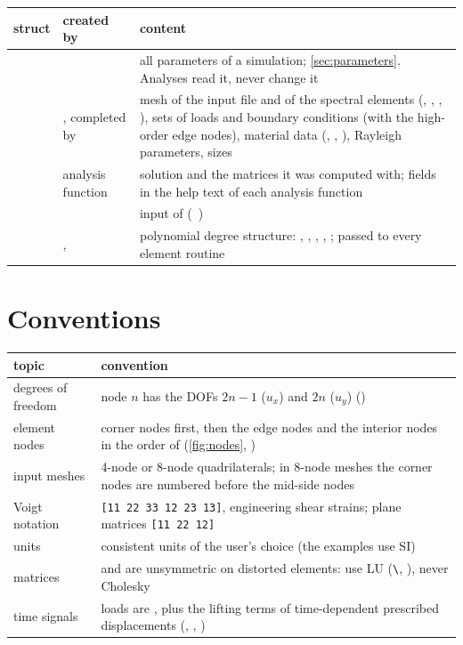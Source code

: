 \begin{xltabular}{\linewidth}{@{}P{2.4cm}P{3.2cm}L@{}}
  \toprule
  struct & created by & content \\
  \midrule
  \endhead
   &  & all parameters of a simulation;
    \cref{sec:parameters}. Analyses read it, never change it \\
   & , completed by  & mesh of
    the input file and of the spectral elements (,
    , , ), sets of loads and boundary conditions
    (with the high-order edge nodes), material data (, ,
    ), Rayleigh parameters, sizes \\
   & analysis function & solution and the matrices it was computed
    with; fields in the help text of each analysis function \\
   &  & input of 
    (~) \\
   & ,  & polynomial degree structure:
    , , , ,
    ; passed to every element routine \\
  \bottomrule
\end{xltabular}

\section{Conventions}

\begin{xltabular}{\linewidth}{@{}P{3.6cm}L@{}}
  \toprule
  topic & convention \\
  \midrule
  \endhead
  degrees of freedom & node $n$ has the DOFs $2n-1$ ($u_x$) and $2n$ ($u_y$)
    () \\
  element nodes & corner nodes first, then the edge nodes and the interior nodes
    in the order of  (\cref{fig:nodes},
    ) \\
  input meshes & 4-node or 8-node quadrilaterals; in 8-node meshes the corner
    nodes are numbered before the mid-side nodes \\
  Voigt notation & \texttt{[11 22 33 12 23 13]}, engineering shear strains; plane
    matrices \texttt{[11 22 12]} \\
  units & consistent units of the user's choice (the examples use SI) \\
  matrices &  and  are unsymmetric on distorted elements: use
    LU (\texttt{\textbackslash}, ), never Cholesky \\
  time signals & loads are , plus the lifting terms
    of time-dependent prescribed displacements (, ,
    ) \\
  \bottomrule
\end{xltabular}

